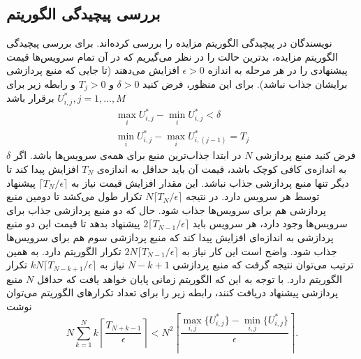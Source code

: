     \subsection{بررسی پیچیدگی الگوریتم}
      نویسندگان در \cite{distributed_auction_algorithms_zavlanos} پیچیدگی الگوریتم مزایده را بررسی کرده‌اند.
      برای بررسی پیچیدگی الگوریتم مزایده، بدترین حالت را در نظر می‌گیریم که در آن تمام سرویس‌ها قیمت پیشنهادی را در هر مرحله به اندازه $\epsilon > 0$ افزایش می‌دهند (تا جایی که منبع پردازشی برایشان جذاب نباشد).
      برای این منظور، فرض کنید $\delta > 0$ و $T_j>0$ و رابطه زیر برای $U_{i,j}^*, j=1,\hdots,M$ برقرار باشد
      \begin{gather}
        \max_i U_{i,j}^* - \min_i U_{i,j}^* < \delta \\
        \min_i U_{i,j}^* - \max_i U_{i,(j-1)}^* = T_j
      \end{gather}
      فرض کنید منبع پردازشی $N$ در ابتدا جذاب‌ترین منبع برای همه‌ی سرویس‌ها باشد.
      اگر $\delta$ به اندازه‌ی کافی کوچک باشد، قیمت آن باید حداقل به اندازه‌ی $T_N$ افزایش پیدا کند تا دیگر تنها منبع پردازشی جذاب نباشد.
      این مقدار افزایش قیمت نیاز به $\lceil T_N / \epsilon \rceil$ پیشنهاد توسط هر سرویس دارد.
      در نتیجه $N \lceil T_N / \epsilon \rceil$ تکرار طول می‌کشد تا دومین منبع پردازشی هم برای سرویس‌ها جذاب شود.
      حال که دو منبع پردازشی جذاب برای سرویس‌ها وجود دارد، هر سرویس باید $2 \lceil T_{N-1} / \epsilon \rceil$ پیشنهاد بدهد تا قیمت این دو منبع پردازشی به اندازه‌ای افزایش پیدا کند که منبع پردازشی سوم هم برای سرویس‌ها جذاب شود.
      واضح است این کار نیاز به $2N \lceil T_{N-1} / \epsilon \rceil$ تکرار الگوریتم دارد.
      به همین ترتیب می‌توان نتیجه گرفت که منبع پردازشی $N-k+1$ نیاز به $kN \lceil T_{N-k+1} / \epsilon \rceil$ تکرار الگوریتم دارد.
      با توجه به این که الگوریتم زمانی پایان خواهد یافت که حداقل $N$ منبع پردازشی پیشنهاد دریافت کنند، رابطه زیر را برای تعداد تکرار‌های الگوریتم می‌توان نوشت
      \begin{equation}
        N\sum_{k=1}^N k \left \lceil \frac{T_{N+k-1}}{\epsilon} \right\rceil < N ^ 2 \left \lceil \frac{\max_{i,j} \{U_{i,j}^*\} - \min_{i,j} \{U_{i,j}^*\}}{\epsilon} \right\rceil.
      \end{equation}
